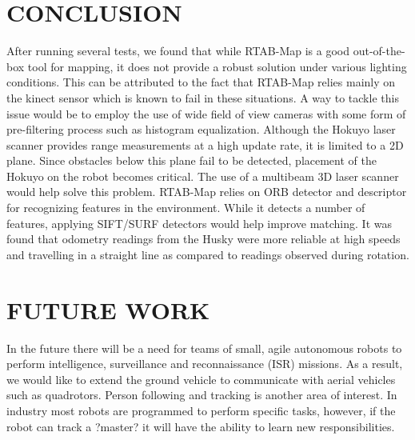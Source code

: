 \documentclass[letterpaper, 10 pt, conference]{ieeeconf}  %
\begin{document}
\section{CONCLUSION}

After running several tests, we found that while RTAB-Map is a good out-of-the-box tool for mapping, it does not provide a robust solution under various lighting conditions. This can be attributed to the fact that RTAB-Map relies mainly on the kinect sensor which is known to fail in these situations. A way to tackle this issue would be to employ the use of wide field of view cameras with some form of pre-filtering process such as histogram equalization.
Although the Hokuyo laser scanner provides range measurements at a high update rate, it is limited to a 2D plane. Since obstacles below this plane fail to be detected, placement of the Hokuyo on the robot becomes critical. The use of a multibeam 3D laser scanner would help solve this problem.
RTAB-Map relies on ORB detector and descriptor for recognizing features in the environment. While it detects a number of features, applying SIFT/SURF detectors would help improve matching. It was found that odometry readings from the Husky were more reliable at high speeds and travelling in a straight line as compared to readings observed during rotation.

\section{FUTURE WORK}

In the future there will be a need for teams of small, agile autonomous robots to perform intelligence, surveillance and reconnaissance (ISR) missions. As a result, we would like to extend the ground vehicle to communicate with aerial vehicles such as quadrotors. Person following and tracking is another area of interest. In industry most robots are programmed to perform specific tasks, however, if the robot can track a ?master? it will have the ability to learn new responsibilities.

\addtolength{\textheight}{-12cm}   %
\end{document}
